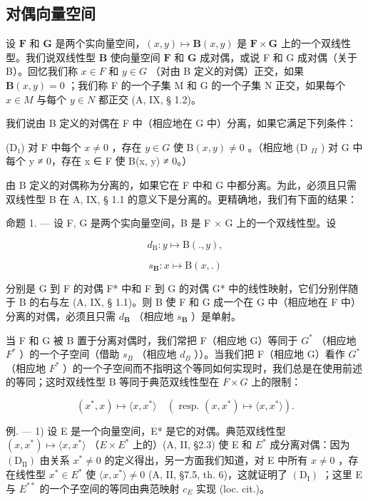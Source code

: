\subsection{对偶向量空间}

设 \(\mathbf{F}\) 和 \(\mathbf{G}\) 是两个实向量空间，\((x, y) \mapsto \mathbf{B}(x, y)\) 是 \(\mathbf{F} \times \mathbf{G}\) 上的一个双线性型。我们说双线性型 \(\mathbf{B}\) 使向量空间 \(\mathbf{F}\) 和 \(\mathbf{G}\) 成对偶，或说 F 和 G 成对偶（关于 B）。回忆我们称 \(x \in F\) 和 \(y \in G\) （对由 B 定义的对偶）正交，如果 \(\mathbf{B}(x, y) = 0\) ；我们称 F 的一个子集 M 和 G 的一个子集 N 正交，如果每个 \(x \in M\) 与每个 \(y \in N\) 都正交 (A, IX, § 1.2)。

我们说由 B 定义的对偶在 F 中（相应地在 G 中）分离，如果它满足下列条件：

(D₁) 对 F 中每个 \(x \neq 0\) ，存在 \(y \in G\) 使 \(\mathrm{B}(x, y) \neq 0\) 。（相应地 (D \(_{II}\) ) 对 G 中每个 y ≠ 0，存在 x ∈ F 使 B(x, y) ≠ 0。）

由 B 定义的对偶称为分离的，如果它在 F 中和 G 中都分离。为此，必须且只需双线性型 B 在 A, IX, § 1.1 的意义下是分离的。更精确地，我们有下面的结果：

命题 1. --- 设 F, G 是两个实向量空间，B 是 F × G 上的一个双线性型。设

\[
d _ {\mathrm{B}}: y \mapsto \mathrm{B} (., y),
\]

\[
s _ {\mathbf {B}} \colon x \mapsto \mathrm{B} (x,.)
\]

分别是 G 到 F 的对偶 F* 中和 F 到 G 的对偶 G* 中的线性映射，它们分别伴随于 B 的右与左 (A, IX, § 1.1)。则 B 使 F 和 G 成一个在 G 中（相应地在 F 中）分离的对偶，必须且只需 \(d_{\mathbf{B}}\) （相应地 \(s_{\mathbf{B}}\) ）是单射。

当 F 和 G 被 B 置于分离对偶时，我们常把 F（相应地 G）等同于 \(G^{*}\) （相应地 \(F^{*}\) ）的一个子空间（借助 \(s_{B}\) （相应地 \(d_{B}\) ））。当我们把 F（相应地 G）看作 \(G^{*}\) （相应地 \(F^{*}\) ）的一个子空间而不指明这个等同如何实现时，我们总是在使用前述的等同；这时双线性型 B 等同于典范双线性型在 \(F \times G\) 上的限制：

\[
(x ^ {*}, x) \mapsto \langle x, x ^ {*} \rangle \quad (\text { resp. } (x, x ^ {*}) \mapsto \langle x, x ^ {*} \rangle).
\]

例. --- 1) 设 E 是一个向量空间，E* 是它的对偶。典范双线性型 \((x, x^{*}) \mapsto \langle x, x^{*} \rangle\) （\(E \times E^{*}\) 上的）(A, II, §2.3) 使 E 和 \(E^{*}\) 成分离对偶：因为 \((\mathrm{D}_{\mathrm{II}})\) 由关系 \(x^{*} \neq 0\) 的定义得出，另一方面我们知道，对 E 中所有 \(x \neq 0\) ，存在线性型 \(x^{*} \in E^{*}\) 使 \(\langle x, x^{*} \rangle \neq 0\) (A, II, §7.5, th. 6)，这就证明了 \((\mathrm{D}_{\mathrm{I}})\) ；这里 E 与 \(E^{**}\) 的一个子空间的等同由典范映射 \(c_{E}\) 实现 (loc. cit.)。

